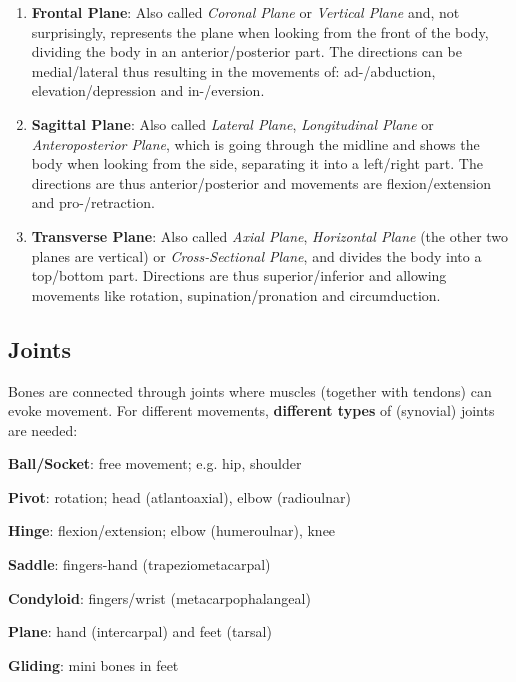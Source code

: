 \begin{enumerate}
    \item \textbf{Frontal Plane}: Also called \textit{Coronal Plane} or \textit{Vertical Plane} and, not surprisingly, represents the plane when looking from the front of the body, dividing the body in an anterior/posterior part.
    The directions can be medial/lateral thus resulting in the movements of: ad-/abduction, elevation/depression and in-/eversion.
    \item \textbf{Sagittal Plane}: Also called \textit{Lateral Plane}, \textit{Longitudinal Plane} or \textit{Anteroposterior Plane}, which is going through the midline and shows the body when looking from the side, separating it into a left/right part.
    The directions are thus anterior/posterior and movements are flexion/extension and pro-/retraction.
    \item \textbf{Transverse Plane}: Also called \textit{Axial Plane}, \textit{Horizontal Plane} (the other two planes are vertical) or \textit{Cross-Sectional Plane}, and divides the body into a top/bottom part.
    Directions are thus superior/inferior and allowing movements like rotation, supination/pronation and circumduction.
\end{enumerate}

\subsection{Joints}\label{subsec:joints}

Bones are connected through joints where muscles (together with tendons) can evoke movement.
For different movements, \textbf{different types} of (synovial) joints are needed:

\begin{itemize*}
    \item \textbf{Ball/Socket}: free movement; e.g. hip, shoulder
    \item \textbf{Pivot}: rotation; head (atlantoaxial), elbow (radioulnar)
    \item \textbf{Hinge}: flexion/extension; elbow (humeroulnar), knee
    \item \textbf{Saddle}: fingers-hand (trapeziometacarpal)
    \item \textbf{Condyloid}: fingers/wrist (metacarpophalangeal)
    \item \textbf{Plane}: hand (intercarpal) and feet (tarsal)
    \item \textbf{Gliding}: mini bones in feet
\end{itemize*}
